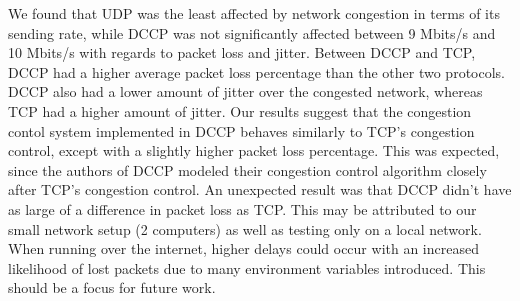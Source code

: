 \documentclass[letterpaper, 9 pt, balance, conference]{ieeeconf}
\begin{document}
We found that UDP was the least affected by network congestion in terms of its
sending rate, while DCCP was not significantly affected between 9 Mbits/s and
10 Mbits/s with regards to packet loss and jitter.  Between DCCP and TCP, DCCP
had a higher average packet loss percentage than the other two protocols. DCCP
also had a lower amount of jitter over the congested network, whereas TCP had a
higher amount of jitter. Our results suggest that the congestion contol system
implemented in DCCP behaves similarly to TCP's congestion control, except with a
slightly higher packet loss percentage. This was expected, since the authors of
DCCP modeled their congestion control algorithm closely after TCP's congestion
control. An unexpected result was that DCCP didn't have as large of
a difference in packet loss as TCP. This may be attributed to our small network
setup (2 computers) as well as testing only on a local network.  When running
over the internet, higher delays could occur with an increased likelihood of
lost packets due to many environment variables introduced.  This should be a
focus for future work.

\balance

\end{document}
